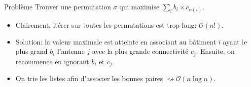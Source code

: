 \begin{frame}
    \frametitle{\problemtitle}
    \begin{block}{Problème}
        Trouver une permutation $\sigma$ qui maximise $\sum_{i} b_i \times c_{\sigma(i)}$.
    \end{block}
    \pause
    \begin{itemize}
        \item<+-> Clairement, itérer sur toutes les permutations est trop long: $\mathcal{O}(n!)$.
        \item<+-> Solution: la valeur maximale est atteinte en associant au bâtiment $i$ ayant le plus grand $b_i$ l'antenne $j$ avec la plus grande connectivité $c_j$. Ensuite, on recommence en ignorant $b_i$ et $c_j$.
        \item<+-> On trie les listes afin d'associer les bonnes paires $\rightsquigarrow \mathcal{O}(n \log n)$.
    \end{itemize}
\end{frame}
